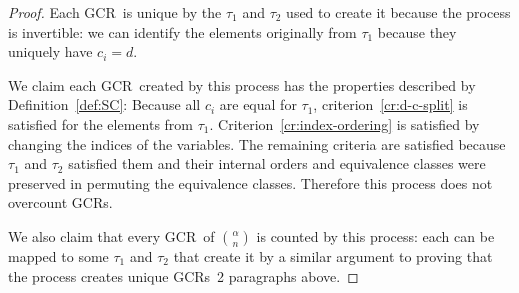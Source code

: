 \documentclass[11pt]{article}
\newcommand{\gencrulenospace}{GCR}
\newcommand{\gencrule}{\gencrulenospace~}
\newcommand{\gencrules}{\gencrulenospace s~}
\newcommand{\gencrulesnospace}{\gencrulenospace s}
\newcommand{\numpoints}{n}
\newcommand{\inumpoints}{i}
\theoremstyle{plain}
\theoremstyle{definition}
\begin{document}
\begin{proof}
Each \gencrule is unique by the $\tau_1$ and $\tau_2$ used to create it because the process is invertible: we can identify the elements originally from $\tau_1$ because they uniquely have $c_{\inumpoints}=d$.

We claim each \gencrule created by this process has the properties described by Definition~\ref{def:SC}: Because all $c_{\inumpoints}$ are equal for $\tau_1$, criterion~\ref{cr:d-c-split} is satisfied for the elements from $\tau_1$.
Criterion~\ref{cr:index-ordering} is satisfied by changing the indices of the variables.
The remaining criteria are satisfied because $\tau_1$ and $\tau_2$ satisfied them and their internal orders and equivalence classes were preserved in permuting the equivalence classes. Therefore this process does not overcount \gencrulesnospace.

We also claim that every \gencrule of $\binom{\alpha}{\numpoints}$ is counted by this process: each can be mapped to some $\tau_1$ and $\tau_2$ that create it by a similar argument to proving that the process creates unique \gencrules 2 paragraphs above.
\end{proof}
\end{document}
